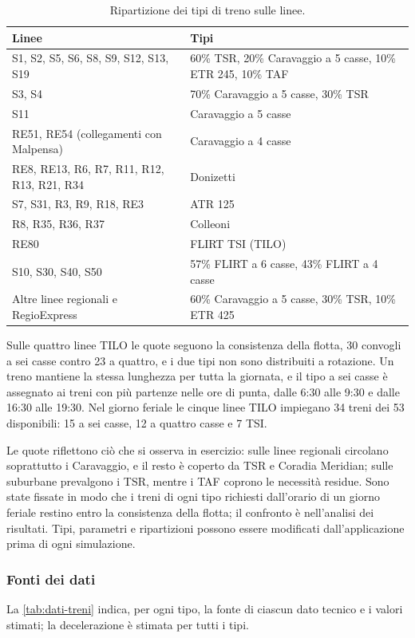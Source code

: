 \begin{table}[H]
	\centering
	\caption{Ripartizione dei tipi di treno sulle linee.}
	\label{tab:rotabile-quote}
	\begin{tabularx}{\textwidth}{>{\raggedright\arraybackslash}p{}X}
		\toprule
		Linee & Tipi \\
		\midrule
		S1, S2, S5, S6, S8, S9, S12, S13, S19 & 60\% TSR, 20\% Caravaggio a 5 casse, 10\% ETR 245, 10\% TAF \\
		S3, S4 & 70\% Caravaggio a 5 casse, 30\% TSR \\
		S11 & Caravaggio a 5 casse \\
		RE51, RE54 (collegamenti con Malpensa) & Caravaggio a 4 casse \\
		RE8, RE13, R6, R7, R11, R12, R13, R21, R34 & Donizetti \\
		S7, S31, R3, R9, R18, RE3 & ATR 125 \\
		R8, R35, R36, R37 & Colleoni \\
		RE80 & FLIRT TSI (TILO) \\
		S10, S30, S40, S50 & 57\% FLIRT a 6 casse, 43\% FLIRT a 4 casse \\
		Altre linee regionali e RegioExpress & 60\% Caravaggio a 5 casse, 30\% TSR, 10\% ETR 425 \\
		\bottomrule
	\end{tabularx}
\end{table}

Sulle quattro linee TILO le quote seguono la consistenza della flotta, 30 convogli a sei casse contro 23 a quattro, e i due tipi non sono distribuiti a rotazione. Un treno mantiene la stessa lunghezza per tutta la giornata, e il tipo a sei casse è assegnato ai treni con più partenze nelle ore di punta, dalle 6:30 alle 9:30 e dalle 16:30 alle 19:30. Nel giorno feriale le cinque linee TILO impiegano 34 treni dei 53 disponibili: 15 a sei casse, 12 a quattro casse e 7 TSI.

Le quote riflettono ciò che si osserva in esercizio: sulle linee regionali circolano soprattutto i Caravaggio, e il resto è coperto da TSR e Coradia Meridian; sulle suburbane prevalgono i TSR, mentre i TAF coprono le necessità residue. Sono state fissate in modo che i treni di ogni tipo richiesti dall'orario di un giorno feriale restino entro la consistenza della flotta; il confronto è nell'analisi dei risultati. Tipi, parametri e ripartizioni possono essere modificati dall'applicazione prima di ogni simulazione.

\subsubsection{Fonti dei dati}
La \cref{tab:dati-treni} indica, per ogni tipo, la fonte di ciascun dato tecnico e i valori stimati; la decelerazione è stimata per tutti i tipi.


